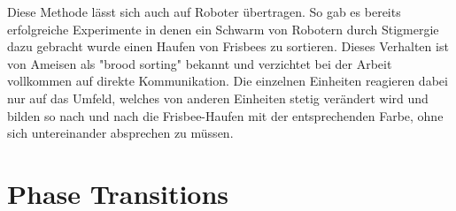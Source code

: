 Diese Methode lässt sich auch auf Roboter übertragen.
So gab es bereits erfolgreiche Experimente in denen ein Schwarm von Robotern durch Stigmergie dazu gebracht wurde einen Haufen von Frisbees zu sortieren.
Dieses Verhalten ist von Ameisen als "brood sorting" bekannt und verzichtet bei der Arbeit vollkommen auf direkte Kommunikation.
Die einzelnen Einheiten reagieren dabei nur auf das Umfeld, welches von anderen Einheiten stetig verändert wird und bilden so nach und nach die Frisbee-Haufen mit der entsprechenden Farbe, ohne sich untereinander absprechen zu müssen.

\section{Phase Transitions}\label{sec:PhaseTransitions}